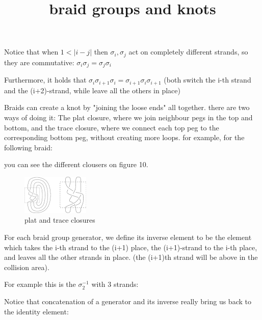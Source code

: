 \documentclass{article}
\begin{document}
Notice that when $1 < |i - j|$ then $\sigma_{i}, \sigma_{j}$ act on completely different strands, so they are commutative: $\sigma_{i}\sigma_{j} = \sigma_{j}\sigma_{i}$

Furthermore, it holds that $\sigma_{i}\sigma_{i+1}\sigma_{i} = \sigma_{i+1}\sigma_{i}\sigma_{i+1}$
(both switch the i-th strand and the (i+2)-strand, while leave all the others in place)


\title{braid groups and knots}
Braids can create a knot by "joining the loose ends" all together. there are two ways of doing it:
The plat closure, where we join neighbour pegs in the top and bottom, and the trace closure, where we connect each top peg to the corresponding bottom peg, without creating more loops.
for example, for the following braid: 

\begin{center}
\end{center} 
you can see the different clousers on figure 10.
\begin{figure}
\includegraphics[scale=0.5]{closures} 
\caption{plat and trace closures}
\end{figure}

For each braid group generator, we define its inverse element to be the element which takes the i-th strand
to the (i+1) place, the (i+1)-strand to the i-th place, and leaves all the other strands in place. (the (i+1)th strand will be above in the collision area).

For example this is the $\sigma_{2}^{-1}$ with 3 strands:
\begin{center}
\end{center}

Notice that concatenation of a generator and its inverse really bring us back to the identity element:
\begin{center}
\end{center}
\end{document}
